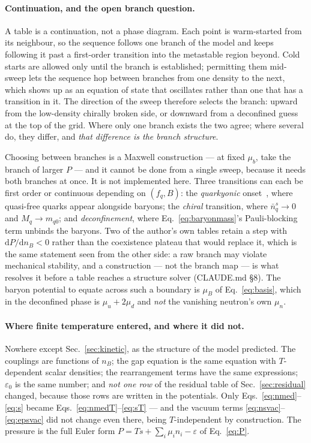 \documentclass[aps,prc,onecolumn,superscriptaddress,nofootinbib,10pt]{revtex4-2}
\newcommand{\nB}{n_B}
\newcommand{\muB}{\mu_B}
\newcommand{\nbs}{\bar{n}^s}
\begin{document}
\paragraph{Continuation, and the open branch question.} A table is a
continuation, not a phase diagram. Each point is warm-started from its
neighbour, so the sequence follows one branch of the model and keeps
following it past a first-order transition into the metastable region beyond.
Cold starts are allowed only until the branch is established; permitting them
mid-sweep lets the sequence hop between branches from one density to the
next, which shows up as an equation of state that oscillates rather than one
that has a transition in it. The direction of the sweep therefore selects the
branch: upward from the low-density chirally broken side, or downward from a
deconfined guess at the top of the grid. Where only one branch exists the two
agree; where several do, they differ, and \emph{that difference is the branch
structure}.

Choosing between branches is a Maxwell construction --- at fixed $\mu_b$,
take the branch of larger $P$ --- and it cannot be done from a single sweep,
because it needs both branches at once. It is not implemented here. Three
transitions can each be first order or continuous depending on $(f_q, B)$:
the \emph{quarkyonic} onset~\cite{McLerranPisarski2007}, where quasi-free
quarks appear alongside baryons; the \emph{chiral} transition, where
$\nbs_q \to 0$ and $M_q \to m_{q0}$; and \emph{deconfinement}, where
Eq.~\eqref{eq:baryonmass}'s Pauli-blocking term unbinds the baryons. Two of
the author's own tables retain a step with $\mathrm{d}P/\mathrm{d}\nB < 0$
rather than the coexistence plateau that would replace it, which is the same
statement seen from the other side: a raw branch may violate mechanical
stability, and a construction --- not the branch map --- is what resolves it
before a table reaches a structure solver (CLAUDE.md \S8). The baryon
potential to equate across such a boundary is $\muB$ of Eq.~\eqref{eq:basis},
which in the deconfined phase is $\mu_u + 2\mu_d$ and \emph{not} the vanishing
neutron's own $\mu_n$.

\paragraph{Where finite temperature entered, and where it did not.}
Nowhere except Sec.~\ref{sec:kinetic}, as the structure of the model
predicted. The couplings are functions of $\nB$; the gap equation is the same
equation with $T$-dependent scalar densities; the rearrangement terms have the
same expressions; $\varepsilon_0$ is the same number; and \emph{not one row}
of the residual table of Sec.~\ref{sec:residual} changed, because those rows
are written in the potentials. Only
Eqs.~\eqref{eq:nmed}--\eqref{eq:s} became
Eqs.~\eqref{eq:nmedT}--\eqref{eq:sT} --- and the vacuum terms
\eqref{eq:nsvac}--\eqref{eq:epsvac} did not change even there, being
$T$-independent by construction. The pressure is the full Euler form
$P = Ts + \sum_i \mu_i n_i - \varepsilon$ of Eq.~\eqref{eq:P}.
\end{document}
